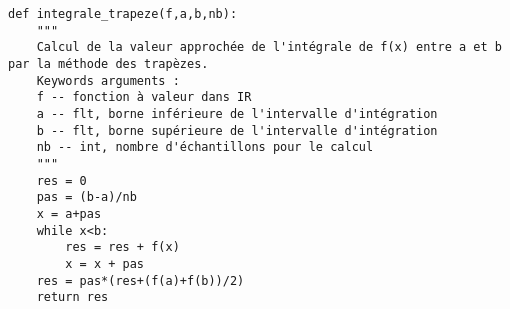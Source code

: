 \begin{lstlisting}
def integrale_trapeze(f,a,b,nb):
    """
    Calcul de la valeur approchée de l'intégrale de f(x) entre a et b par la méthode des trapèzes.
    Keywords arguments :
    f -- fonction à valeur dans IR
    a -- flt, borne inférieure de l'intervalle d'intégration
    b -- flt, borne supérieure de l'intervalle d'intégration
    nb -- int, nombre d'échantillons pour le calcul
    """
    res = 0
    pas = (b-a)/nb
    x = a+pas
    while x<b:
        res = res + f(x)
        x = x + pas
    res = pas*(res+(f(a)+f(b))/2)
    return res
\end{lstlisting}

